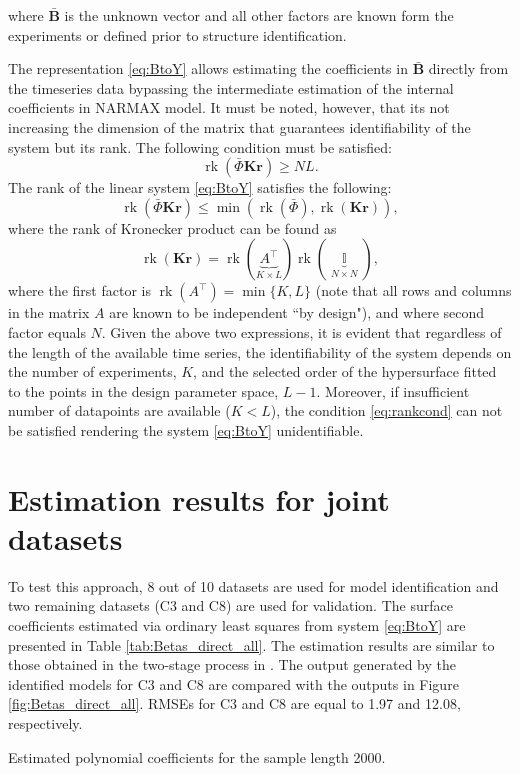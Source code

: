 \documentclass[a4paper,11pt,twoside]{article}
\DeclareMathOperator{\eye}{\mathbb{I}}
\DeclareMathOperator{\rk}{\mathrm{rk}}
\theoremstyle{mytheoremstyle}
\begin{document}
where $\bar{\mathbf{B}}$ is the unknown vector and all other factors are known form the experiments or defined prior to structure identification. 
\par The representation \eqref{eq:BtoY} allows estimating the coefficients in  $\bar{\mathbf{B}}$ directly from the timeseries data bypassing the intermediate estimation of the internal coefficients in NARMAX model. It must be noted, however, that its not increasing the dimension of the matrix that guarantees identifiability of the system but its rank. The following condition must be satisfied:
\begin{equation}\label{eq:rankcond}
\rk(\bar{\Phi}\mathbf{Kr}) \geq NL.
\end{equation}
The rank of the linear system \eqref{eq:BtoY} satisfies the following:
\begin{equation}
\rk (\bar{\Phi}\mathbf{Kr}) \leq \min\left(\rk(\bar{\Phi}), \rk(\mathbf{Kr})\right),
\end{equation}
where the rank of Kronecker product can be found as
\begin{equation}
\rk(\mathbf{Kr}) = \rk(\underbrace{A^{\top}}_{K \times L})\rk(\underbrace{\eye}_{N \times N}),
\end{equation}
where the first factor is $\rk(A^{\top}) = \min\{K, L\}$ (note that all rows and columns in the matrix $A$ are known to be independent ``by design"), and where second factor equals $N$. Given the above two expressions, it is evident that regardless of the length of the available time series, the identifiability of the system depends on the number of experiments, $K$, and the selected order of the hypersurface fitted to the points in the design parameter space, $L-1$. Moreover, if insufficient number of datapoints are available ($K < L$), the condition \eqref{eq:rankcond} can not be satisfied rendering the system \eqref{eq:BtoY} unidentifiable.
\section{Estimation results for joint datasets}
\par To test this approach, 8 out of 10 datasets are used for model identification and two remaining datasets (C3 and C8) are used for validation. The surface coefficients estimated via ordinary least squares from system \eqref{eq:BtoY} are presented in Table \ref{tab:Betas_direct_all}. The estimation results are similar to those obtained in the two-stage process in \cite{Wei2008}. The output generated by the identified models for C3 and C8 are compared with the outputs in Figure \ref{fig:Betas_direct_all}. RMSEs for C3 and C8 are equal to 1.97 and 12.08, respectively.
\begin{table}[!h]
	\centering
	\caption{Estimated polynomial coefficients for the sample length 2000.}\label{tab:Betas_direct_all}
	\small
	
\end{table}
\end{document}
